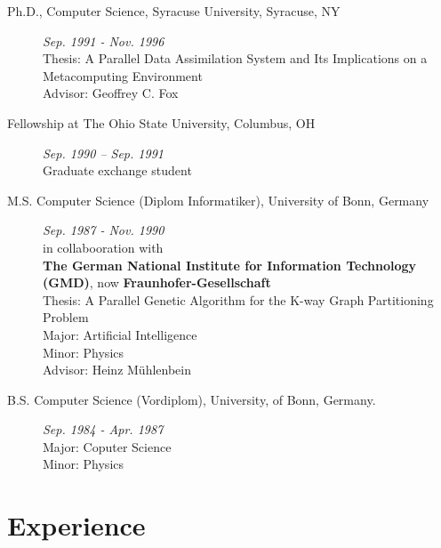 \documentclass{article}
\begin{document}
\begin{description}
\item[Ph.D., Computer Science, Syracuse University, Syracuse, NY] \hfill {\it Sep. 1991 - Nov. 1996} ~\\
      Thesis: A Parallel Data Assimilation System and Its Implications   
      on a Metacomputing Environment\\
      Advisor: Geoffrey C. Fox 

\item[Fellowship at The Ohio State University,
  Columbus, OH] \hfill {\it Sep. 1990 – Sep. 1991}~\\
  Graduate exchange student

\item[M.S. Computer Science (Diplom Informatiker), University of Bonn, Germany] \hfill {\it Sep. 1987 - Nov. 1990}~\\
  in collabooration with \\
  {\bf The German National Institute for Information Technology (GMD)}, now {\bf Fraunhofer-Gesellschaft} ~\\
  Thesis: A Parallel Genetic Algorithm for the K-way Graph Partitioning Problem  \\
  Major: Artificial Intelligence \\
  Minor: Physics \\  
  Advisor: Heinz Mühlenbein 

\item[B.S. Computer Science (Vordiplom), University, of Bonn, Germany.] \hfill {\it Sep. 1984 - Apr. 1987} ~\\  
  Major: Coputer Science\\
  Minor: Physics \\  

\end{description}
 

\section{Experience}
\end{document}
